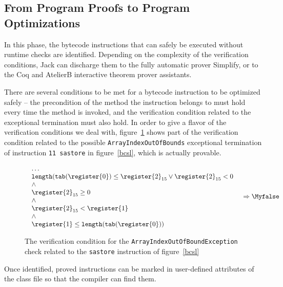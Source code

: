 

\subsection{From Program Proofs to Program Optimizations }
\label{proofs}
In this phase, the bytecode instructions that can safely be executed without runtime checks are identified. Depending on the complexity of the verification conditions, Jack can discharge them to the fully automatic prover Simplify, or to the Coq and AtelierB interactive theorem prover assistants.

There are several conditions to be met for a bytecode instruction to be optimized safely -- the precondition of the method the instruction belongs to must hold every time the method is invoked, and the verification condition related to the exceptional termination must also hold. In order to give a flavor of the verification conditions we deal with, figure~\ref{proofs:vc} shows part of the  verification condition related to the possible \texttt{ArrayIndexOutOfBounds} exceptional termination of instruction \verb!11 sastore! in figure~\ref{bcsl}, which is actually provable.

\begin{figure}
\[
  \begin{array}{ll}
    \begin{array}{l}
        \ldots \\
     \texttt{length} ( \texttt{tab}(  \register{0}) \leq \register{2}_{15} \vee \register{2}_{15}< 0   \\
       \wedge \\
        \register{2}_{15 } \geq 0 \\
	\wedge \\
       \register{2}_{15 }< \register{1} \\
       \wedge \\
        \register{1} \leq  \texttt{length} ( \texttt{tab}( \register{0} ) ) \\
        \end{array}
     &  \Rightarrow  \Myfalse
  \end{array}\]
\caption{The verification condition for the \texttt{ArrayIndexOutOfBoundException} check related to the \texttt{sastore} instruction of figure~\ref{bcsl}}
\label{proofs:vc}
\end{figure}

Once identified, proved instructions can be marked in user-defined attributes of the class file so that the compiler can find them.
